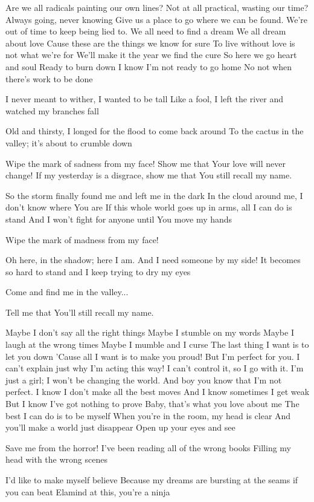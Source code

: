 Are we all radicals painting our own lines?
Not at all practical, wasting our time?
Always going, never knowing
Give us a place to go where we can be found.
We're out of time to keep being lied to.
We all need to find a dream
We all dream about love
Cause these are the things we know for sure
To live without love is not what we're for
We'll make it the year we find the cure
So here we go heart and soul
Ready to burn down
I know I'm not ready to go home
No not when there's work to be done


I never meant to wither, I wanted to be tall
Like a fool, I left the river and watched my branches fall

Old and thirsty, I longed for the flood to come back around
To the cactus in the valley; it's about to crumble down

Wipe the mark of sadness from my face!
Show me that Your love will never change!
If my yesterday is a disgrace, show me that You still recall my name.

So the storm finally found me and left me in the dark
In the cloud around me, I don’t know where You are
If this whole world goes up in arms, all I can do is stand
And I won’t fight for anyone until You move my hands

Wipe the mark of madness from my face!

Oh here, in the shadow; here I am.
And I need someone by my side!
It becomes so hard to stand and I keep trying to dry my eyes

Come and find me in the valley...

Tell me that You'll still recall my name.


Maybe I don't say all the right things
Maybe I stumble on my words
Maybe I laugh at the wrong times
Maybe I mumble and I curse
The last thing I want is to let you down
'Cause all I want is to make you proud!
But I'm perfect for you.
I can't explain just why I'm acting this way!
I can't control it, so I go with it.
I'm just a girl; I won't be changing the world.
And boy you know that I'm not perfect.
I know I don't make all the best moves
And I know sometimes I get weak
But I know I've got nothing to prove
Baby, that's what you love about me
The best I can do is to be myself
When you're in the room, my head is clear
And you'll make a world just disappear
Open up your eyes and see


Save me from the horror!
I've been reading all of the wrong books
Filling my head with the wrong scenes


I'd like to make myself believe
Because my dreams are bursting at the seams
if you can beat Elamind at this, you're a ninja

